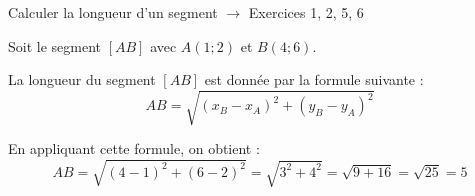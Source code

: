\documentclass[a4paper]{article}
\begin{document}
\begin{methode*}[sidebyside, righthand width=2.2cm,segmentation code={}, sidebyside align=bottom]{Calculer la longueur d'un segment $\longrightarrow$ Exercices 1, 2, 5, 6}{}

  Soit le segment $[AB]$ avec $A(1; 2)$ et $B(4; 6)$.

  La longueur du segment $[AB]$ est donnée par la formule suivante :
  $$
  AB = \sqrt{(x_B - x_A)^2 + (y_B - y_A)^2}
  $$

  En appliquant cette formule, on obtient :
  $$
  AB = \sqrt{(4 - 1)^2 + (6 - 2)^2} = \sqrt{3^2 + 4^2} = \sqrt{9 + 16} = \sqrt{25} = 5
  $$

  \tcblower
  


\end{methode*}
\end{document}
